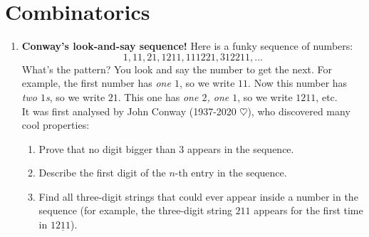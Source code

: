 \documentclass[11pt]{scrartcl}
\begin{document}
\newpage
\section{Combinatorics}
\begin{enumerate}[label=\textbf{C\arabic*}.]
    \item \textbf{Conway's look-and-say sequence!} \newline
    Here is a funky sequence of numbers:
    $$1, 11, 21, 1211, 111221, 312211, ...$$
    What's the pattern? You look and say the number to get the next. For example, the first number has \emph{one $1$}, so we write $11$. Now this number has \emph{two $1$s}, so we write $21$. This one has \emph{one $2$, one $1$}, so we write $1211$, etc.\\
    It was first analysed by John Conway (1937-2020 $\heartsuit$), who discovered many cool properties:
    
    \begin{enumerate}
        \item Prove that no digit bigger than $3$ appears in the sequence.
        \item Describe the first digit of the $n$-th entry in the sequence.
        \item Find all three-digit strings that could ever appear inside a number in the sequence (for example, the three-digit string $211$ appears for the first time in $1\underline{211}$). 
    \end{enumerate}
\end{enumerate}

\newpage
\end{document}
